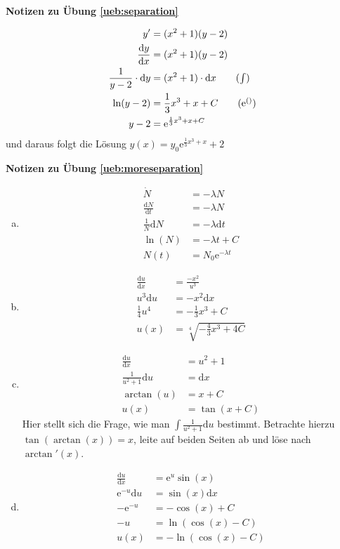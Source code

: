 \documentclass[%
11pt,%
twoside,%
titlepage,%
swissgerman,%
headsepline%
]{scrartcl}
\newcommand{\faReturnGray}{\textcolor{gray}{\faMailReply}} %
\theoremstyle{definition}
\theoremstyle{plain}
\newcommand{\concatueb}[1]{ueb:#1}%
\newcommand{\concatlsg}[1]{lsg:#1}%
\newenvironment{lsg}[1]{%
    \par\noindent\textbf{Notizen zu Übung \ref{\concatueb{#1}}}\label{\concatlsg{#1}}
    \hfill\hyperref[\concatueb{#1}]{\faReturnGray}\par %
}{%
    \par%
}
\begin{document}
\begin{lsg}{separation}
    \begin{align*}
        y' &= (x^2+1)(y-2)\\
        \frac{\mathrm{d}y}{\mathrm{d}x} &= (x^2+1)(y-2)\\
        \frac{1}{y-2}\cdot\mathrm{d}y &= (x^2+1)\cdot\mathrm{d}x\tag{$\int$}\\
        \ln(y-2) &= \frac{1}{3}x^3+x+C\tag{$\mathrm{e}^{()}$}\\
        y-2 &= \mathrm{e}^{\frac{1}{3}x^3+x+C}
    \end{align*}
    und daraus folgt die Lösung $y(x)=y_0\mathrm{e}^{\frac{1}{3}x^3+x}+2$
\end{lsg}
\begin{lsg}{moreseparation}
    \begin{enumerate}[a)]
        \item \begin{align*}
            \dot{N} &= -\lambda N\\
            \frac{\mathrm{d}N}{\mathrm{d}t} &= -\lambda N\\
            \frac{1}{N}\mathrm{d}N &= -\lambda\mathrm{d}t\\
            \ln(N) &= -\lambda t+C\\
            N(t) &= N_0\mathrm{e}^{-\lambda t}
        \end{align*}
        \item \begin{align*}
            \frac{\mathrm{d}u}{\mathrm{d}x} &= \frac{-x^2}{u^3}\\
             u^3\mathrm{d}u &= -x^2\mathrm{d}x\\
             \frac{1}{4}u^4 &= -\frac{1}{3}x^3+C\\
             u(x) &= \sqrt[4]{-\frac{4}{3}x^3+4C}
        \end{align*}
        \item \begin{align*}
            \frac{\mathrm{d}u}{\mathrm{d}x} &= u^2+1\\
            \frac{1}{u^2+1}\mathrm{d}u &= \mathrm{d}x\\
            \arctan(u) &= x+C\\
            u(x) &= \tan(x+C)
        \end{align*}
        Hier stellt sich die Frage, wie man $\int\frac{1}{u^2+1}\mathrm{d}u$ bestimmt. Betrachte hierzu $\tan(\arctan(x))=x$, leite auf beiden Seiten ab und löse nach $\arctan'(x)$.
        \item \begin{align*}
            \frac{\mathrm{d}u}{\mathrm{d}x} &= \mathrm{e}^{u}\sin(x)\\
            \mathrm{e}^{-u}\mathrm{d}u &= \sin(x)\mathrm{d}x\\
            -\mathrm{e}^{-u} &= -\cos(x)+C\\
            -u &= \ln(\cos(x)-C)\\
            u(x) &= -\ln(\cos(x)-C)
        \end{align*}
    \end{enumerate}
\end{lsg}
\end{document}
